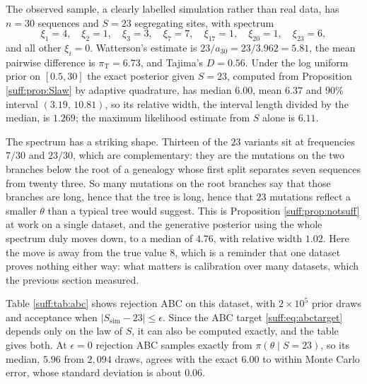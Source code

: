 \begin{example}
\label{suff:ex:locus}
The observed sample, a clearly labelled simulation rather than real data, has $n=30$ sequences
and $S=23$ segregating sites, with spectrum
\[
\xi_1=4,\quad \xi_2=1,\quad \xi_3=3,\quad \xi_7=7,\quad \xi_{17}=1,\quad \xi_{20}=1,\quad
\xi_{23}=6,
\]
and all other $\xi_i=0$. Watterson's estimate is $23/a_{30}=23/3.962=5.81$, the mean pairwise
difference is $\pi_{\mathrm{T}}=6.73$, and Tajima's $D=0.56$. Under the log uniform prior on
$[0.5,30]$ the exact posterior given $S=23$, computed from Proposition \ref{suff:prop:Slaw} by
adaptive quadrature, has median $6.00$, mean $6.37$ and $90\%$ interval $(3.19,\,10.81)$, so
its relative width, the interval length divided by the median, is $1.269$; the maximum
likelihood estimate from $S$ alone is $6.11$.

The spectrum has a striking shape. Thirteen of the $23$ variants sit at frequencies $7/30$
and $23/30$, which are complementary: they are the mutations on the two branches below the
root of a genealogy whose first split separates seven sequences from twenty three. So many
mutations on the root branches say that those branches are long, hence that the tree is long,
hence that $23$ mutations reflect a smaller $\theta$ than a typical tree would suggest. This
is Proposition \ref{suff:prop:notsuff} at work on a single dataset, and the generative
posterior using the whole spectrum duly moves down, to a median of $4.76$, with relative width
$1.02$. Here the move is away from the true value $8$, which is a reminder that one
dataset proves nothing either way: what matters is calibration over many datasets, which the
previous section measured.
\end{example}

Table \ref{suff:tab:abc} shows rejection ABC on this dataset, with $2\times10^5$ prior draws
and acceptance when $|S_{\mathrm{sim}}-23|\le\epsilon$. Since the ABC target
\eqref{suff:eq:abctarget} depends only on the law of $S$, it can also be computed exactly, and
the table gives both. At $\epsilon=0$ rejection ABC samples exactly from $\pi(\theta\mid S=23)$,
so its median, $5.96$ from $2{,}094$ draws, agrees with the exact $6.00$ to within Monte Carlo
error, whose standard deviation is about $0.06$.

